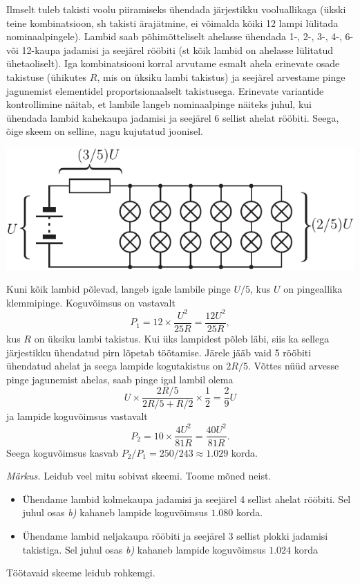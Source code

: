 \documentclass[11pt, twoside]{article}
\begin{document}
{{\ifSolution
\osa Ilmselt tuleb takisti voolu piiramiseks ühendada järjestikku vooluallikaga (ükski teine kombinatsioon, sh takisti ärajätmine, ei võimalda kõiki 12 lampi lülitada nominaalpingele). Lambid saab põhimõtteliselt ahelasse ühendada 1-, 2-, 3-, 4-, 6- või 12-kaupa jadamisi ja seejärel rööbiti (st kõik lambid on ahelasse lülitatud ühetaoliselt). Iga kombinatsiooni korral arvutame esmalt ahela erinevate osade takistuse (ühikutes $R$, mis on üksiku lambi takistus) ja seejärel arvestame pinge jagunemist elementidel proportsionaalselt takistusega. Erinevate variantide kontrollimine näitab, et lambile langeb nominaalpinge näiteks juhul, kui ühendada lambid kahekaupa jadamisi ja seejärel 6 sellist ahelat rööbiti. Seega, õige skeem on selline, nagu kujutatud joonisel.

\begin{center}
\includegraphics{2018-v2g-08-lambid-joonis.pdf}
\end{center}

Kuni kõik lambid põlevad, langeb igale lambile pinge $U/5$, kus $U$ on pingeallika klemmipinge. Koguvõimsus on vastavalt
\[
P_1=12\times \frac{U^2}{25R}=\frac{12U^2}{25R},
\]
kus $R$ on üksiku lambi takistus. Kui üks lampidest põleb läbi, siis ka sellega järjestikku ühendatud pirn lõpetab töötamise. Järele jääb vaid 5 rööbiti ühendatud ahelat ja seega lampide kogutakistus on $2R/5$. Võttes nüüd arvesse pinge jagunemist ahelas, saab pinge igal lambil olema
\[
U\times \frac{2R/5}{2R/5+R/2} \times \frac{1}{2}=\frac{2}{9}U
\]
ja lampide koguvõimsus vastavalt
\[
P_2=10\times \frac{4U^2}{81R}=\frac{40U^2}{81R}.
\]
Seega koguvõimsus kasvab $P_2/P_1=250/243\approx \num{1.029}$ korda.

\textit{Märkus.} Leidub veel mitu sobivat skeemi. Toome mõned neist.
\begin{itemize} 
\item
Ühendame lambid kolmekaupa jadamisi ja seejärel 4 sellist ahelat rööbiti. Sel juhul osas \textit{b)} kahaneb lampide koguvõimsus $\num{1.080}$ korda.
\item
Ühendame lambid neljakaupa rööbiti ja seejärel 3 sellist plokki jadamisi takistiga. Sel juhul osas \textit{b)} kahaneb lampide koguvõimsus $\num{1.024}$ korda
\end{itemize}
Töötavaid skeeme leidub rohkemgi.
\fi
}

}
\end{document}
